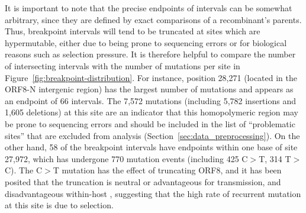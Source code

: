 \documentclass{article}
\begin{document}
It is important to note that the precise endpoints of intervals can be
somewhat arbitrary, since they are defined by exact comparisons
of a recombinant's parents.
Thus, breakpoint intervals will tend to be truncated at sites which are
hypermutable, either due to being prone to sequencing errors or
for biological reasons such as selection pressure.
It is therefore helpful to compare the number of intersecting intervals
with the number of mutations per site in Figure~\ref{fig:breakpoint-distribution}.
For instance, position 28,271 (located in the ORF8-N intergenic
region) has the largest number of mutations and appears as an endpoint
of 66 intervals.
The 7,572 mutations (including 5,782 insertions and 1,605 deletions)
at this site are an indicator that this
homopolymeric region may be prone to sequencing errors
and should be included in the list of ``problematic sites'' that
are excluded from analysis (Section~\ref{sec:data_preprocessing}).
On the other hand, 58 of the breakpoint intervals have endpoints
within one base of site 27,972, which has undergone 770 mutation events
(including 425 C$>$T, 314 T$>$C). The C$>$T mutation has the effect of
truncating ORF8, and it has been posited that the truncation is neutral
or advantageous for transmission, and disadvantageous within-host
\citep{Jungreis2021-dh}, suggesting that the high rate of recurrent mutation
at this site is due to selection.
\end{document}
